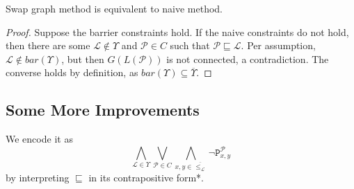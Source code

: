 \documentclass[12pt]{llncs}
\let\oldleq\leq
\renewcommand{\leq}[1][]{\oldleq_{#1}}
\newcommand{\poset}[1]{\mathcal{#1}}
\newcommand{\lang}[1]{L(#1)}
\newcommand{\sgraph}[1]{G(#1)}
\newcommand{\lext}{\sqsubseteq}
\newcommand{\complmt}[1]{\overline{#1}}
\begin{document}
\begin{proposition}
    Swap graph method is equivalent to naive method.
\end{proposition}
\begin{proof}
    Suppose the barrier constraints hold. If the naive constraints do not hold, then there are some $\poset{L} \!\not\in\! \Upsilon$ and $\poset{P} \!\in\! C$ such that $\poset{P} \lext \poset{L}$. Per assumption, $\poset{L} \!\not\in\! bar(\Upsilon)$, but then $\sgraph{\lang{\poset{P}}}$ is not connected, a contradiction. The converse holds by definition, as $bar(\Upsilon) \subseteq \complmt{\Upsilon}$.
\end{proof}

\subsection{Some More Improvements}
We encode it as
\[
\bigwedge_{\poset{L} \in \Upsilon} \bigvee_{\poset{P} \in C} \bigwedge_{x,y \in \complmt{\leq[\poset{L}]}} \neg \mathtt{P}_{x,y}^{\poset{P}}
\]
by interpreting $\lext$ in its contrapositive form*.

\end{document}
